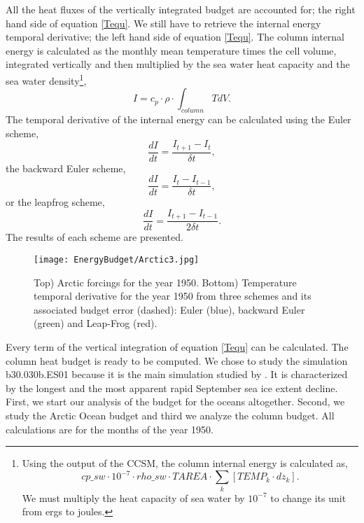 All the heat fluxes of the vertically integrated budget are accounted for; the right hand side of equation \ref{Tequ}. We still have to retrieve the internal energy temporal derivative; the left hand side of equation \ref{Tequ}. The column internal energy is calculated as the monthly mean temperature times the cell volume, integrated vertically and then multiplied by the sea water heat capacity and the sea water density\footnote{Using the output of the CCSM, the column internal energy is calculated as, 
\begin{equation}
cp\_sw \cdot 10^{-7} \cdot rho\_sw \cdot TAREA\cdot \sum_{k} \left[TEMP_k \cdot dz_k\right].
\end{equation}
We must multiply the heat capacity of sea water by $10^{-7}$ to change its unit from ergs to joules.},
\begin{equation}
I = c_p\cdot \rho \cdot \int_{column} T dV.
\end{equation}
The temporal derivative of the internal energy can be calculated using the Euler scheme, 
\begin{equation}
\frac{dI}{dt} = \frac{I_{t+1}-I_{t}}{\delta t},
\end{equation}
the backward Euler scheme,
\begin{equation}
\frac{dI}{dt} = \frac{I_{t}-I_{t-1}}{\delta t},
\end{equation}
 or the leapfrog scheme, 
 \begin{equation}
\frac{dI}{dt} = \frac{I_{t+1}-I_{t-1}}{2 \delta t}.
\end{equation}
The results of each scheme are presented.  

\begin{figure}[t!]
\center
\texttt{[image: EnergyBudget/Arctic3.jpg]}
\caption{ Top) Arctic forcings for the year 1950. Bottom) Temperature temporal derivative for the year 1950 from three schemes and its associated budget error (dashed): Euler (blue), backward Euler (green) and Leap-Frog (red). }
\label{A3}
\end{figure}

Every term of the vertical integration of equation \ref{Tequ} can be calculated. The column heat budget is ready to be computed. We chose to study the simulation b30.030b.ES01 because it is the main simulation studied by \cite{ISI:000242942100008}. It is characterized by the longest and the most apparent rapid September sea ice extent decline. First, we start our analysis of the budget for the oceans altogether. Second, we study the Arctic Ocean budget and third we analyze the column budget. All calculations are for the months of the year 1950.

